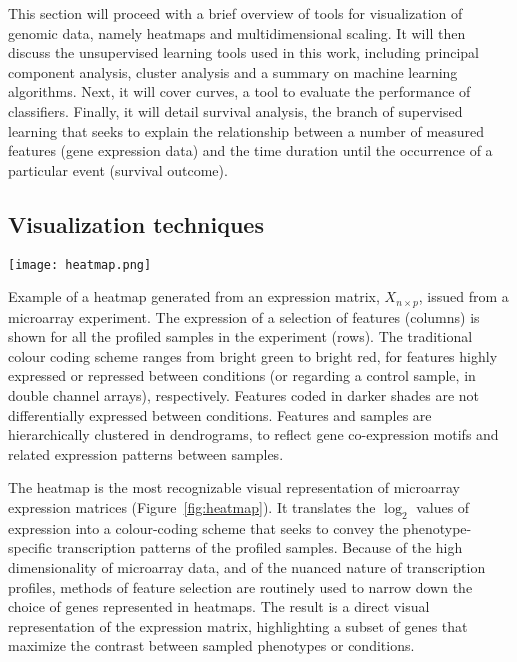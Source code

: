 
\medskip

This section will proceed with a brief overview of tools for visualization of
genomic data, namely heatmaps and multidimensional scaling.  It will then
discuss the unsupervised learning tools used in this work, including principal
component analysis, cluster analysis and a summary on machine learning
algorithms.  Next, it will cover  curves, a tool to evaluate the
performance of classifiers.
Finally, it will detail survival analysis, the branch of supervised learning
that seeks to explain the relationship between a number of measured features
(gene expression data) and the time duration until the occurrence of a
particular event (survival outcome).

\subsection{Visualization techniques}
\label{sec:methods-visualization}
\begin{marginfigure}%
    \texttt{[image: heatmap.png]}
    \caption[Example of a heatmap]{Example of a heatmap generated from an
      expression matrix, $X_{n \times p}$, issued from a 
      microarray experiment.  The expression of a selection of features
      (columns) is shown for all the profiled samples in the experiment (rows).
      The traditional colour coding scheme ranges from bright green to bright
      red, for features highly expressed or repressed between conditions (or
      regarding a control sample, in double channel arrays), respectively.
      Features coded in darker shades are not differentially expressed between
      conditions.  Features and samples are hierarchically clustered in
      dendrograms, to reflect gene co-expression motifs and related expression
      patterns between samples.}
    \label{fig:heatmap}%
\end{marginfigure}

The heatmap is the most recognizable visual representation of microarray
expression matrices (Figure~\ref{fig:heatmap}).  It translates the $\log_2$
values of expression into a colour-coding scheme that seeks to convey the
phenotype-specific transcription patterns of the profiled samples.  Because of
the high dimensionality of microarray data, and of the nuanced nature of
transcription profiles, methods of feature selection are routinely used to
narrow down the choice of genes represented in heatmaps.  The result is a direct
visual representation of the expression matrix, highlighting a subset of genes
that maximize the contrast between sampled phenotypes or conditions.

